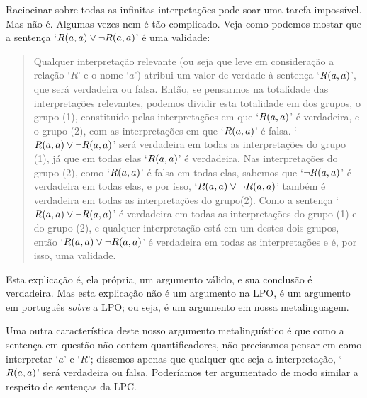Raciocinar sobre todas as infinitas interpetações pode soar uma tarefa impossível.
Mas não é.
Algumas vezes nem  é tão complicado.
Veja como podemos mostar que a sentença \mbox{`$\mathord{R}(a,a)\vee\neg \mathord{R}(a,a)$'} é uma validade:
	\begin{quote}
		\label{allmodels1}
		Qualquer interpretação relevante (ou seja que leve em consideração a relação `$R$' e o nome `$a$') atribui um valor de verdade à sentença `$\mathord{R}(a,a)$', que será verdadeira ou falsa.
		Então, se pensarmos na totalidade das interpretações relevantes, podemos dividir esta totalidade em dos grupos, o grupo (1), constituído pelas interpretações em que `$\mathord{R}(a,a)$' é verdadeira, e o grupo (2), com as interpretações em que  `$\mathord{R}(a,a)$' é falsa.
		`$\mathord{R}(a,a)\vee\neg \mathord{R}(a,a)$' será verdadeira em todas as interpretações do grupo (1), já que em todas elas `$\mathord{R}(a,a)$' é verdadeira.
		Nas interpretações do grupo (2), como  `$\mathord{R}(a,a)$' é falsa em todas elas, sabemos que `$\neg \mathord{R}(a,a)$' é verdadeira em todas elas, e por isso, `$\mathord{R}(a,a)\vee\neg \mathord{R}(a,a)$' também é verdadeira em todas as interpretações do grupo(2).
		Como a sentença `$\mathord{R}(a,a)\vee\neg \mathord{R}(a,a)$' é verdadeira em todas as interpretações do grupo (1) e do grupo (2), e qualquer interpretação está em um destes dois grupos, então `$\mathord{R}(a,a)\vee\neg \mathord{R}(a,a)$' é verdadeira em todas as interpretações e é, por isso, uma validade.
	\end{quote}
Esta explicação é, ela própria, um argumento válido, e sua conclusão é verdadeira. Mas esta explicação não é um argumento na LPO, é um argumento em português \emph{sobre} a LPO; ou seja, é um argumento em nossa metalinguagem.

Uma outra característica deste nosso argumento metalinguístico é que como a sentença em questão não contem quantificadores, não precisamos pensar em como interpretar `$a$' e `$R$'; dissemos apenas que qualquer que seja a interpretação,  `$\mathord{R}(a,a)$' será verdadeira ou falsa.
Poderíamos ter argumentado de modo similar a respeito de sentenças da LPC.

